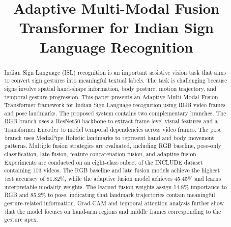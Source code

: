 \documentclass[conference]{IEEEtran}
\begin{document}
\title{Adaptive Multi-Modal Fusion Transformer for Indian Sign Language Recognition}

\author{
\and
{}
}

\maketitle

\begin{abstract}
Indian Sign Language (ISL) recognition is an important assistive vision task that aims to convert sign gestures into meaningful textual labels. The task is challenging because signs involve spatial hand-shape information, body posture, motion trajectory, and temporal gesture progression. This paper presents an Adaptive Multi-Modal Fusion Transformer framework for Indian Sign Language recognition using RGB video frames and pose landmarks. The proposed system contains two complementary branches. The RGB branch uses a ResNet50 backbone to extract frame-level visual features and a Transformer Encoder to model temporal dependencies across video frames. The pose branch uses MediaPipe Holistic landmarks to represent hand and body movement patterns. Multiple fusion strategies are evaluated, including RGB baseline, pose-only classification, late fusion, feature concatenation fusion, and adaptive fusion. Experiments are conducted on an eight-class subset of the INCLUDE dataset containing 103 videos. The RGB baseline and late fusion models achieve the highest test accuracy of 81.82\%, while the adaptive fusion model achieves 45.45\% and learns interpretable modality weights. The learned fusion weights assign 14.8\% importance to RGB and 85.2\% to pose, indicating that landmark trajectories contain meaningful gesture-related information. Grad-CAM and temporal attention analysis further show that the model focuses on hand-arm regions and middle frames corresponding to the gesture apex.
\end{abstract}
\end{document}
